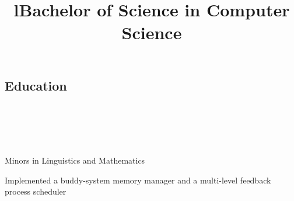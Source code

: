 \documentclass[12pt, tweaklist, line]{res}
\let\tempone\itemize
\let\temptwo\enditemize
\renewenvironment{itemize}{\tempone\vspace{-.15in}\setlength{\topsep}{0pt}\setlength{\itemsep}{3pt}\vspace{-.15in}}{\temptwo}
\begin{document}
\begin{resume}
\section{Education}
\begin{format}
  \\
  \title{l}\\
  \body\\
\end{format}

\title{Bachelor of Science in Computer Science}
\begin{position}
\begin{itemize}
\item Minors in Linguistics and Mathematics
\item Implemented a buddy-system memory manager and a multi-level feedback process scheduler
\end{itemize}
\end{position}


\end{resume}
\end{document}
